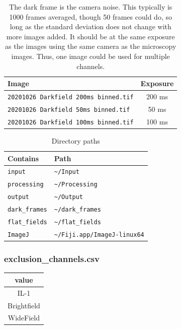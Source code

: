 \begin{table}[htb]
  \centering
  \caption{The dark frame is the camera noise. This typically is 1000 frames averaged, though 50 frames could do, so long as the standard deviation does not change with more images added. It should be at the same exposure as the images using the same camera as the microscopy images. Thus, one image could be used for multiple channels.}
  \label{tab:dark\_frames}
  \begin{tabular}{ | l | c | }
    \hline
    \textbf{Image} & \textbf{Exposure} \\ \hline
    \texttt{20201026 Darkfield 200ms binned.tif} & 200 ms \\ \hline
    \texttt{20201026 Darkfield 50ms binned.tif} & 50 ms \\ \hline
    \texttt{20201026 Darkfield 100ms binned.tif} & 100 ms \\ \hline
  \end{tabular}
\end{table}

\begin{table}[htb]
  \centering
  \caption{Directory paths}
  \label{tab:directories}
  \begin{tabular}{ | l | p{10cm} | }
    \hline
    \textbf{Contains} & \textbf{Path} \\ \hline
    \texttt{input} & \texttt{\textasciitilde/Input} \\ \hline
    \texttt{processing} & \texttt{\textasciitilde/Processing} \\ \hline
    \texttt{output} & \texttt{\textasciitilde/Output} \\ \hline
    \texttt{dark\_frames} & \texttt{\textasciitilde/dark\_frames} \\ \hline
    \texttt{flat\_fields} & \texttt{\textasciitilde/flat\_fields} \\ \hline
    \texttt{ImageJ} & \texttt{\textasciitilde/Fiji.app/ImageJ-linux64} \\ \hline
  \end{tabular}
\end{table}


\subsubsection*{exclusion\_channels.csv}
\begin{tabular}{|c|}
    \hline
    value \\
    \hline
    IL-1 \\
    Brightfield \\
    WideField \\
    \hline
\end{tabular}

